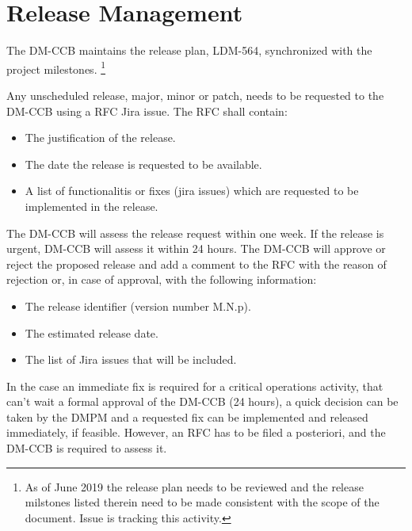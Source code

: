 \section{Release Management} \label{sec:process}

The DM-CCB maintains the release plan, LDM-564, synchronized with the project milestones.
\footnote{As of June 2019 the release plan needs to be reviewed and the release milstones listed therein need to be made consistent with the scope of the document.
Issue  is tracking this activity.}

Any unscheduled release, major, minor or patch, needs to be requested to the DM-CCB using a RFC Jira issue.
The RFC shall contain:

\begin{itemize}
\item The justification of the release.
\item The date the release is requested to be available.
\item A list of functionalitis or fixes (jira issues) which are requested to be implemented in the release.
\end{itemize}

The DM-CCB  will assess the release request within one week. 
If the release is urgent, DM-CCB will assess it  within 24 hours.
The DM-CCB will approve or reject the proposed release and add a comment to the RFC with the reason of rejection or, in case of approval, with the following information:

\begin{itemize}
\item The release identifier (version number M.N.p).
\item The estimated release date.
\item The list of Jira issues that will be included.
\end{itemize}

In the case an immediate fix is required for a critical operations activity, that can't wait a formal approval of the DM-CCB (24 hours),
a quick decision can be taken by the \gls{DMPM} and a requested fix can be implemented and released immediately, if feasible.
However, an \gls{RFC} has to be filed a posteriori, and the DM-CCB is required to assess it.

